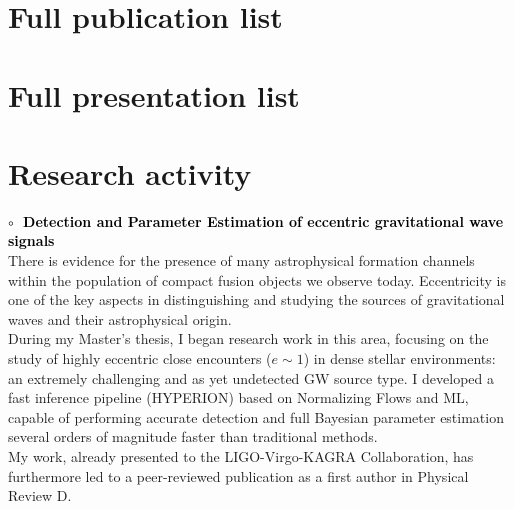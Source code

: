 

\pagebreak
\section{Full publication list}%




\section{Full presentation list}%



\pagebreak
\section{Research activity}
\textbf{\textcolor{black}{\hspace{0.4cm}$\circ\;$ Detection and Parameter Estimation of eccentric gravitational wave signals}}\vspace{0.05cm}\\
\indent There is evidence for the presence of many astrophysical formation channels within the
population of compact fusion objects we observe today.
Eccentricity is one of the key aspects in distinguishing and studying the sources of
gravitational waves and their astrophysical origin.\\
During my Master's thesis, I began research work in this area, focusing on the study of highly
eccentric close encounters ($e\sim1$) in dense stellar environments: an extremely challenging and
as yet undetected GW source type.
I developed a fast inference pipeline (\textsc{HYPERION}) based on Normalizing Flows and ML,
capable of performing accurate detection and full Bayesian parameter estimation several
orders of magnitude faster than traditional methods.\\
My work, already presented to the LIGO-Virgo-KAGRA Collaboration, has furthermore led to a
peer-reviewed publication as a first author in Physical Review D.
\medskip

